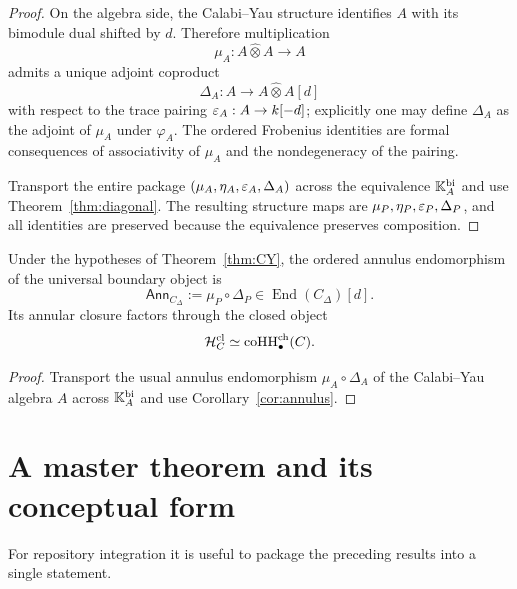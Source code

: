 \begin{proof}
On the algebra side, the Calabi--Yau structure identifies $A$ with its bimodule dual shifted by
$d$. Therefore multiplication
\[
\mu_A:A\widehat\otimes A\to A
\]
admits a unique adjoint coproduct
\[
\Delta_A:A\to A\widehat\otimes A[d]
\]
with respect to the trace pairing $\varepsilon_A:A\to k[-d]$; explicitly one may define $\Delta_A$ as the
adjoint of $\mu_A$ under $\varphi_A$. The ordered Frobenius identities are formal consequences of
associativity of $\mu_A$ and the nondegeneracy of the pairing.

Transport the entire package $(\mu_A,\eta_A,\varepsilon_A,\Delta_A)$ across the equivalence
$\mathbb{K}_A^{\mathrm{bi}}$ and use Theorem~\ref{thm:diagonal}. The resulting structure maps are
$\mu_P,\eta_P,\varepsilon_P,\Delta_P$, and all identities are preserved because the equivalence preserves
composition.
\end{proof}

\begin{corollary}
Under the hypotheses of Theorem~\ref{thm:CY}, the ordered annulus endomorphism of the universal
boundary object is
\[
\mathsf{Ann}_{C_\Delta}:=\mu_P\circ \Delta_P\in \operatorname{End}(C_\Delta)[d].
\]
Its annular closure factors through the closed object
\[
\mathcal H_C^{\mathrm{cl}}\simeq \operatorname{coHH}^{\mathrm{ch}}_\bullet(C).
\]
\end{corollary}

\begin{proof}
Transport the usual annulus endomorphism $\mu_A\circ \Delta_A$ of the Calabi--Yau algebra $A$ across
$\mathbb{K}_A^{\mathrm{bi}}$ and use Corollary~\ref{cor:annulus}.
\end{proof}

\section{A master theorem and its conceptual form}

For repository integration it is useful to package the preceding results into a single statement.

